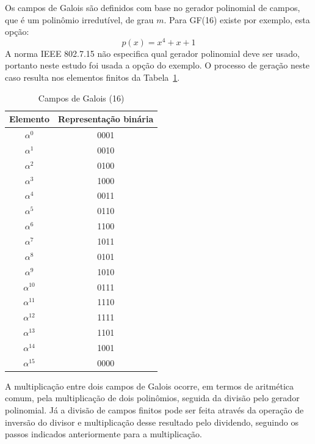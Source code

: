 	Os campos de Galois são definidos com base no gerador polinomial de campos, que é um polinômio irredutível, de grau $m$. Para GF(16) existe por exemplo, esta opção:
	\begin{equation}
	p(x) = x^{4} + x + 1
	\end{equation}
	A norma IEEE 802.7.15 não especifica qual gerador polinomial deve ser usado, portanto neste estudo foi usada a opção do exemplo. O processo de geração neste caso resulta nos elementos finitos da Tabela~\ref{tab:galois}.
	\begin{table}[]
		\centering
		\caption{Campos de Galois (16)}
		\label{tab:galois}
		\begin{tabular}{|c|c|}
			\hline
			Elemento & Representação binária \\ \hline
			$\alpha^{0}$   & 0001                  \\ \hline
			$\alpha^{1}$   & 0010                  \\ \hline
			$\alpha^{2}$   & 0100                  \\ \hline
			$\alpha^{3}$   & 1000                  \\ \hline
			$\alpha^{4}$   & 0011                  \\ \hline
			$\alpha^{5}$   & 0110                  \\ \hline
			$\alpha^{6}$   & 1100                  \\ \hline
			$\alpha^{7}$   & 1011                  \\ \hline
			$\alpha^{8}$   & 0101                  \\ \hline
			$\alpha^{9}$   & 1010                  \\ \hline
			$\alpha^{10}$  & 0111                  \\ \hline
			$\alpha^{11}$  & 1110                  \\ \hline
			$\alpha^{12}$  & 1111                  \\ \hline
			$\alpha^{13}$  & 1101                  \\ \hline
			$\alpha^{14}$  & 1001                  \\ \hline
			$\alpha^{15}$  & 0000                  \\ \hline
		\end{tabular}
	\end{table}

	A multiplicação entre dois campos de Galois ocorre, em termos de aritmética comum, pela multiplicação de dois polinômios, seguida da divisão pelo gerador polinomial. Já a divisão  de campos finitos pode ser feita através da operação de inversão do divisor e multiplicação desse resultado pelo dividendo, seguindo os passos indicados anteriormente para a multiplicação.

